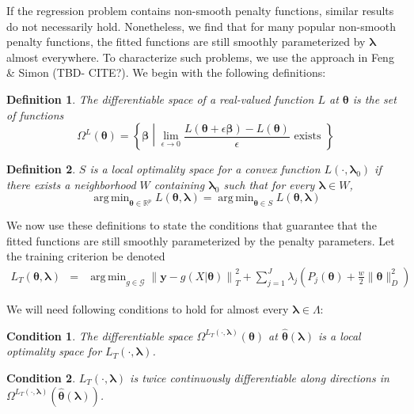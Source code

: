 \documentclass[12pt]{article}
\newtheorem{definition}{Definition}
\newtheorem{condition}{Condition}
\DeclareMathOperator*{\argmin}{arg\,min}
\begin{document}
If the regression problem contains non-smooth penalty functions, similar results do not necessarily hold. Nonetheless, we find that for many popular non-smooth penalty functions, the fitted functions are still smoothly parameterized by $\boldsymbol \lambda$ almost everywhere. To characterize such problems, we use the approach in Feng \& Simon (TBD- CITE?). We begin with the following definitions:

\begin{definition}
	The differentiable space of a real-valued function $L$ at $\boldsymbol{\theta}$ is the set of functions
	\begin{equation}
	\Omega^{L}(\boldsymbol{\theta}) = \left \{ \boldsymbol{\beta} \middle | \lim_{\epsilon \rightarrow 0} \frac{L(\boldsymbol{\theta} + \epsilon \boldsymbol{\beta}) - L(\boldsymbol{\theta})}{\epsilon} \text{ exists } \right \}
	\end{equation}
\end{definition}

\begin{definition}
	$S$ is a local optimality space for a convex function $L(\cdot, \boldsymbol \lambda_0)$ if there exists a neighborhood $W$ containing $\boldsymbol \lambda_0$ such that for every $\boldsymbol \lambda \in W$,
	\begin{equation}
	\argmin_{\boldsymbol{\theta} \in \mathbb{R}^p} L(\boldsymbol{\theta}, \boldsymbol \lambda) =
	\argmin_{\boldsymbol{\theta} \in S} L(\boldsymbol{\theta}, \boldsymbol \lambda)
	\end{equation}
\end{definition}

We now use these definitions to state the conditions that guarantee that the fitted functions are still smoothly parameterized by the penalty parameters.
Let the training criterion be denoted
\begin{eqnarray*}
	L_T(\boldsymbol{\theta}, \boldsymbol{\lambda}) &=& \argmin_{g\in \mathcal{G}} 
	\left \| \boldsymbol y -  g(X| \boldsymbol{\theta}) \right \|^2_T 
	+ \sum_{j=1}^J \lambda_j \left ( P_j(\boldsymbol{\theta}) + \frac{w}{2} \| \boldsymbol{\theta} \|^2_D \right )
\end{eqnarray*}

We will need following conditions to hold for almost every $\boldsymbol{\lambda} \in \Lambda$:
\begin{condition}
	\label{condn:nonsmooth1}
	The differentiable space $\Omega^{L_T(\cdot, \boldsymbol{\lambda})}(\boldsymbol{\theta})$ at $\hat{\boldsymbol \theta}\left(\boldsymbol{\lambda}\right)$ is a local optimality space for $L_T\left(\cdot,\boldsymbol{\lambda}\right)$.
\end{condition}
\begin{condition}
	\label{condn:nonsmooth2}
	$L_T(\cdot, \boldsymbol{\lambda})$ is twice continuously differentiable along directions in $\Omega^{L_T(\cdot, \boldsymbol{\lambda})}(\hat{\boldsymbol \theta}\left(\boldsymbol{\lambda}\right))$.
\end{condition}
\end{document}
